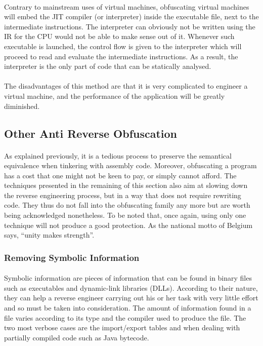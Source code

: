 \paragraph{}
Contrary to mainstream uses of virtual machines, obfuscating virtual machines will embed the JIT compiler (or interpreter) inside the executable file, next to the intermediate instructions. The interpreter can obviously not be written using the IR for the CPU would not be able to make sense out of it. Whenever such executable is launched, the control flow is given to the interpreter which will proceed to read and evaluate the intermediate instructions. As a result, the interpreter is the only part of code that can be statically analysed.

\paragraph{}
The disadvantages of this method are that it is very complicated to engineer a virtual machine, and the performance of the application will be greatly diminished.

\subsection{Other Anti Reverse Obfuscation}
\paragraph{}
As explained previously, it is a tedious process to preserve the semantical equivalence when tinkering with assembly code. Moreover, obfuscating a program has a cost that one might not be keen to pay, or simply cannot afford. The techniques presented in the remaining of this section also aim at slowing down the reverse engineering process, but in a way that does not require rewriting code. They thus do not fall into the obfuscating family any more but are worth being acknowledged nonetheless. To be noted that, once again, using only one technique will not produce a good protection. As the national motto of Belgium says, “unity makes strength”.    

\subsubsection{Removing Symbolic Information}
\paragraph{}
Symbolic information are pieces of information that can be found in binary files such as executables and dynamic-link libraries (DLLs). According to their nature, they can help a reverse engineer carrying out his or her task with very little effort and so must be taken into consideration. The amount of information found in a file varies according to its type and the compiler used to produce the file. The two most verbose cases are the import/export tables and when dealing with partially compiled code such as Java bytecode.

